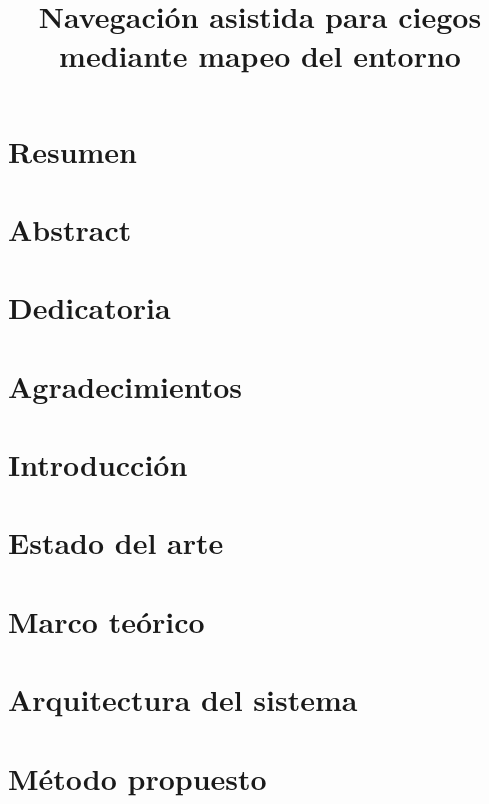 \documentclass[a4paper,12pt]{report}
\title{Navegación asistida para ciegos mediante mapeo del entorno}
\author{}
\begin{document}
    

    \chapter*{Resumen}
    

    \chapter*{Abstract}
    

    \chapter*{Dedicatoria}

    \chapter*{Agradecimientos}

    \tableofcontents
    \listoffigures
    \listoftables

    \chapter{Introducción}
    \label{chap:introduccion}
    

    \chapter{Estado del arte}
    \label{chap:estado-arte}
    

    \chapter{Marco teórico}
    \label{chap:marco-teorico}
    

    \chapter{Arquitectura del sistema}

    \label{chap:arquitectura}
    

    \chapter{Método propuesto}
    \label{chap:metodo}
    
\end{document}
